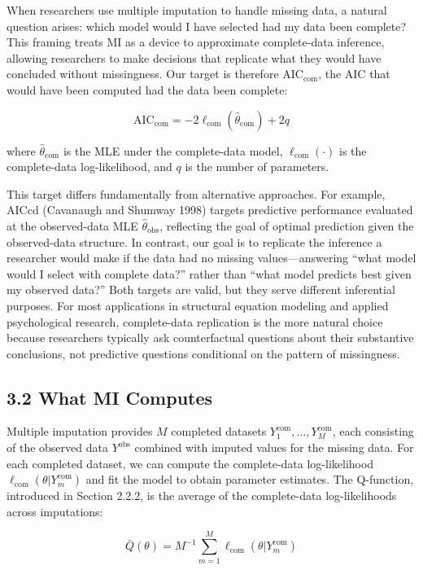 \documentclass[
]{article}
\begin{document}
When researchers use multiple imputation to handle missing data, a
natural question arises: which model would I have selected had my data
been complete? This framing treats MI as a device to approximate
complete-data inference, allowing researchers to make decisions that
replicate what they would have concluded without missingness. Our target
is therefore \(\text{AIC}_{\text{com}}\), the AIC that would have been
computed had the data been complete:

\[\text{AIC}_{\text{com}} = -2\ell_{\text{com}}(\hat{\theta}_{\text{com}}) + 2q\]

where \(\hat{\theta}_{\text{com}}\) is the MLE under the complete-data
model, \(\ell_{\text{com}}(\cdot)\) is the complete-data log-likelihood,
and \(q\) is the number of parameters.

This target differs fundamentally from alternative approaches. For
example, AICcd (Cavanaugh and Shumway 1998) targets predictive
performance evaluated at the observed-data MLE
\(\hat{\theta}_{\text{obs}}\), reflecting the goal of optimal prediction
given the observed-data structure. In contrast, our goal is to replicate
the inference a researcher would make if the data had no missing
values---answering ``what model would I select with complete data?''
rather than ``what model predicts best given my observed data?'' Both
targets are valid, but they serve different inferential purposes. For
most applications in structural equation modeling and applied
psychological research, complete-data replication is the more natural
choice because researchers typically ask counterfactual questions about
their substantive conclusions, not predictive questions conditional on
the pattern of missingness.

\subsection{3.2 What MI Computes}\label{what-mi-computes}

Multiple imputation provides \(M\) completed datasets
\(Y_1^{\text{com}}, \ldots, Y_M^{\text{com}}\), each consisting of the
observed data \(Y^{\text{obs}}\) combined with imputed values for the
missing data. For each completed dataset, we can compute the
complete-data log-likelihood
\(\ell_{\text{com}}(\theta | Y_m^{\text{com}})\) and fit the model to
obtain parameter estimates. The Q-function, introduced in Section 2.2.2,
is the average of the complete-data log-likelihoods across imputations:

\[\bar{Q}(\theta) = M^{-1}\sum_{m=1}^M \ell_{\text{com}}(\theta | Y_m^{\text{com}})\]
\end{document}
